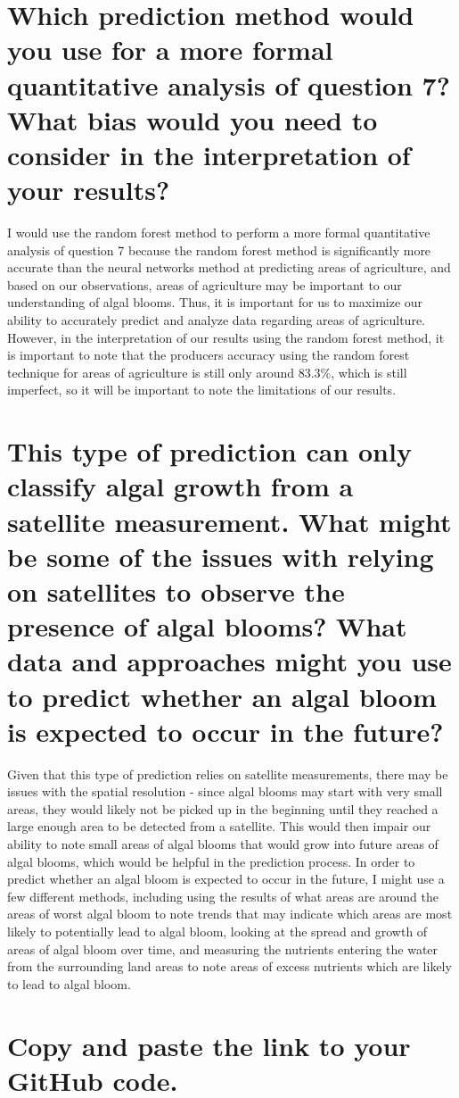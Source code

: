 \documentclass[11pt]{article}
\begin{document}
\section{Which prediction method would you use for a more formal quantitative analysis of question 7? What bias would you need to consider in the interpretation of your results?}

I would use the random forest method to perform a more formal quantitative analysis of question 7 because the random forest method is significantly more accurate than the neural networks method at predicting areas of agriculture, and based on our observations, areas of agriculture may be important to our understanding of algal blooms. Thus, it is important for us to maximize our ability to accurately predict and analyze data regarding areas of agriculture. However, in the interpretation of our results using the random forest method, it is important to note that the producers accuracy using the random forest technique for areas of agriculture is still only around 83.3\%, which is still imperfect, so it will be important to note the limitations of our results. 

\section{This type of prediction can only classify algal growth from a satellite measurement. What might be some of the issues with relying on satellites to observe the presence of algal blooms? What data and approaches might you use to predict whether an algal bloom is expected to occur in the future?}

Given that this type of prediction relies on satellite measurements, there may be issues with the spatial resolution - since algal blooms may start with very small areas, they would likely not be picked up in the beginning until they reached a large enough area to be detected from a satellite. This would then impair our ability to note small areas of algal blooms that would grow into future areas of algal blooms, which would be helpful in the prediction process. In order to predict whether an algal bloom is expected to occur in the future, I might use a few different methods, including using the results of what areas are around the areas of worst algal bloom to note trends that may indicate which areas are most likely to potentially lead to algal bloom, looking at the spread and growth of areas of algal bloom over time, and measuring the nutrients entering the water from the surrounding land areas to note areas of excess nutrients which are likely to lead to algal bloom.

\section{Copy and paste the link to your GitHub code.}
\end{document}
